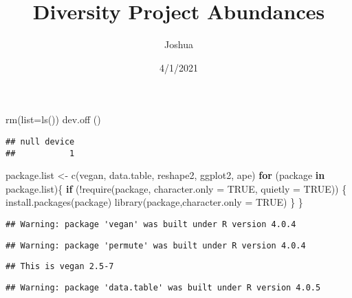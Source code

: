 \documentclass[
]{article}
\title{Diversity Project Abundances}
\author{Joshua}
\date{4/1/2021}
\newenvironment{Shaded}{\begin{snugshade}}{\end{snugshade}}
\newcommand{\AttributeTok}[1]{\textcolor[rgb]{0.77,0.63,0.00}{#1}}
\newcommand{\ConstantTok}[1]{\textcolor[rgb]{0.00,0.00,0.00}{#1}}
\newcommand{\ControlFlowTok}[1]{\textcolor[rgb]{0.13,0.29,0.53}{\textbf{#1}}}
\newcommand{\FunctionTok}[1]{\textcolor[rgb]{0.00,0.00,0.00}{#1}}
\newcommand{\NormalTok}[1]{#1}
\newcommand{\OtherTok}[1]{\textcolor[rgb]{0.56,0.35,0.01}{#1}}
\newcommand{\SpecialCharTok}[1]{\textcolor[rgb]{0.00,0.00,0.00}{#1}}
\newcommand{\StringTok}[1]{\textcolor[rgb]{0.31,0.60,0.02}{#1}}
\begin{document}
\maketitle

\begin{Shaded}
\begin{Highlighting}[]
\FunctionTok{rm}\NormalTok{(}\AttributeTok{list=}\FunctionTok{ls}\NormalTok{())}
\FunctionTok{dev.off}\NormalTok{ ()}
\end{Highlighting}
\end{Shaded}

\begin{verbatim}
## null device 
##           1
\end{verbatim}

\begin{Shaded}
\begin{Highlighting}[]
\NormalTok{package.list }\OtherTok{\textless{}{-}} \FunctionTok{c}\NormalTok{(}\StringTok{\textquotesingle{}vegan\textquotesingle{}}\NormalTok{, }\StringTok{\textquotesingle{}data.table\textquotesingle{}}\NormalTok{, }\StringTok{\textquotesingle{}reshape2\textquotesingle{}}\NormalTok{, }\StringTok{\textquotesingle{}ggplot2\textquotesingle{}}\NormalTok{, }\StringTok{\textquotesingle{}ape\textquotesingle{}}\NormalTok{)}
\ControlFlowTok{for}\NormalTok{ (package }\ControlFlowTok{in}\NormalTok{ package.list)\{}
  \ControlFlowTok{if}\NormalTok{ (}\SpecialCharTok{!}\FunctionTok{require}\NormalTok{(package, }\AttributeTok{character.only =} \ConstantTok{TRUE}\NormalTok{, }\AttributeTok{quietly =} \ConstantTok{TRUE}\NormalTok{)) \{}
    \FunctionTok{install.packages}\NormalTok{(package)}
    \FunctionTok{library}\NormalTok{(package,}\AttributeTok{character.only =} \ConstantTok{TRUE}\NormalTok{)}
\NormalTok{  \}}
\NormalTok{\}}
\end{Highlighting}
\end{Shaded}

\begin{verbatim}
## Warning: package 'vegan' was built under R version 4.0.4
\end{verbatim}

\begin{verbatim}
## Warning: package 'permute' was built under R version 4.0.4
\end{verbatim}

\begin{verbatim}
## This is vegan 2.5-7
\end{verbatim}

\begin{verbatim}
## Warning: package 'data.table' was built under R version 4.0.5
\end{verbatim}
\end{document}
